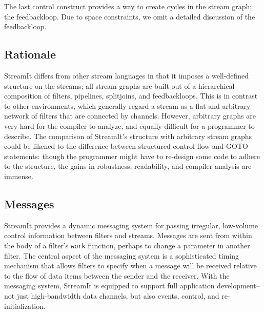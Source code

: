 The last control construct provides a way to create cycles in the
stream graph: the feedbackloop.  Due to space constraints, we omit a
detailed discussion of the feedbackloop.

\subsection{Rationale}

StreamIt differs from other stream languages in that it imposes a
well-defined structure on the streams; all stream graphs are built out
of a hierarchical composition of filters, pipelines, splitjoins, and
feedbackloops.  This is in contrast to other environments, which
generally regard a stream as a flat and arbitrary network of filters
that are connected by channels.  However, arbitrary graphs are very
hard for the compiler to analyze, and equally difficult for a
programmer to describe.  The comparison of StreamIt's structure with
arbitrary stream graphs could be likened to the difference between
structured control flow and GOTO statements: though the programmer
might have to re-design some code to adhere to the structure, the
gains in robustness, readability, and compiler analysis are immense.

\subsection{Messages}

StreamIt provides a dynamic messaging system for passing irregular,
low-volume control information between filters and streams.  Messages
are sent from within the body of a filter's {\tt work} function,
perhaps to change a parameter in another filter.  The central aspect
of the messaging system is a sophisticated timing mechanism that
allows filters to specify when a message will be received relative to
the flow of data items between the sender and the receiver.  With the
messaging system, StreamIt is equipped to support full application
development--not just high-bandwidth data channels, but also events,
control, and re-initialization.
